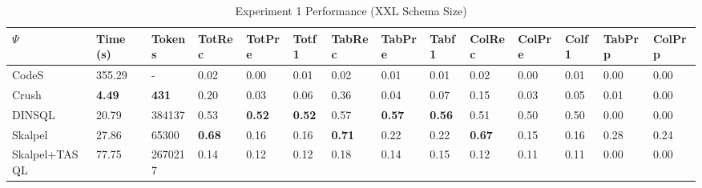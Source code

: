 \begin{table}
\caption{Experiment 1 Performance (XXL Schema Size)}
\label{tab:exp1-xxl-schema}
\begin{tabular}{llllllllllllll}
\toprule
$\Psi$ & Time (s) & Tokens & TotRec & TotPre & Totf1 & TabRec & TabPre & Tabf1 & ColRec & ColPre & Colf1 & TabPrp & ColPrp \\
\midrule
CodeS & 355.29 & - & 0.02 & 0.00 & 0.01 & 0.02 & 0.01 & 0.01 & 0.02 & 0.00 & 0.01 & 0.00 & 0.00 \\
Crush & \textbf{4.49} & \textbf{431} & 0.20 & 0.03 & 0.06 & 0.36 & 0.04 & 0.07 & 0.15 & 0.03 & 0.05 & 0.01 & 0.00 \\
DINSQL & 20.79 & 384137 & 0.53 & \textbf{0.52} & \textbf{0.52} & 0.57 & \textbf{0.57} & \textbf{0.56} & 0.51 & 0.50 & 0.50 & 0.00 & 0.00 \\
Skalpel & 27.86 & 65300 & \textbf{0.68} & 0.16 & 0.16 & \textbf{0.71} & 0.22 & 0.22 & \textbf{0.67} & 0.15 & 0.16 & 0.28 & 0.24 \\
Skalpel+TASQL & 77.75 & 2670217 & 0.14 & 0.12 & 0.12 & 0.18 & 0.14 & 0.15 & 0.12 & 0.11 & 0.11 & 0.00 & 0.00 \\
\bottomrule
\end{tabular}
\end{table}
